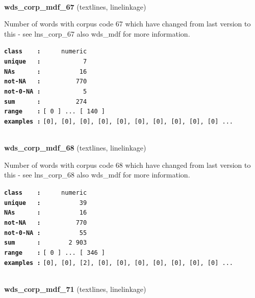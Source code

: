 \documentclass[]{article}
\begin{document}
~

\textbf{wds\_corp\_mdf\_67} (textlines, linelinkage)

Number of words with corpus code 67 which have changed from last version
to this - see lns\_corp\_67 also wds\_mdf for more information.

\textbf{\texttt{class\ \ \ \ :}} \texttt{~~~~~numeric}\\
\textbf{\texttt{unique\ \ \ :}} \texttt{~~~~~~~~~~~7}\\
\textbf{\texttt{NAs\ \ \ \ \ \ :}} \texttt{~~~~~~~~~~16}\\
\textbf{\texttt{not-NA\ \ \ :}} \texttt{~~~~~~~~~770}\\
\textbf{\texttt{not-0-NA\ :}} \texttt{~~~~~~~~~~~5}\\
\textbf{\texttt{sum\ \ \ \ \ \ :}} \texttt{~~~~~~~~~274}\\
\textbf{\texttt{range\ \ \ \ :}}
\texttt{{[}\ 0\ {]}\ ...\ {[}\ 140\ {]}}\\
\textbf{\texttt{examples\ :}}
\texttt{{[}0{]},\ {[}0{]},\ {[}0{]},\ {[}0{]},\ {[}0{]},\ {[}0{]},\ {[}0{]},\ {[}0{]},\ {[}0{]},\ {[}0{]}\ ...}\\

~

\textbf{wds\_corp\_mdf\_68} (textlines, linelinkage)

Number of words with corpus code 68 which have changed from last version
to this - see lns\_corp\_68 also wds\_mdf for more information.

\textbf{\texttt{class\ \ \ \ :}} \texttt{~~~~~numeric}\\
\textbf{\texttt{unique\ \ \ :}} \texttt{~~~~~~~~~~39}\\
\textbf{\texttt{NAs\ \ \ \ \ \ :}} \texttt{~~~~~~~~~~16}\\
\textbf{\texttt{not-NA\ \ \ :}} \texttt{~~~~~~~~~770}\\
\textbf{\texttt{not-0-NA\ :}} \texttt{~~~~~~~~~~55}\\
\textbf{\texttt{sum\ \ \ \ \ \ :}} \texttt{~~~~~~~2~903}\\
\textbf{\texttt{range\ \ \ \ :}}
\texttt{{[}\ 0\ {]}\ ...\ {[}\ 346\ {]}}\\
\textbf{\texttt{examples\ :}}
\texttt{{[}0{]},\ {[}0{]},\ {[}2{]},\ {[}0{]},\ {[}0{]},\ {[}0{]},\ {[}0{]},\ {[}0{]},\ {[}0{]},\ {[}0{]}\ ...}\\

~

\textbf{wds\_corp\_mdf\_71} (textlines, linelinkage)
\end{document}
